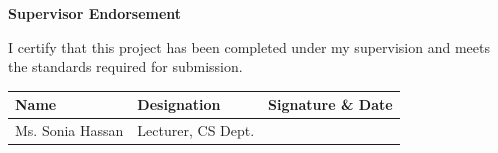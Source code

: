 \vspace{0.5cm}

\noindent\textbf{\textcolor{primaryblue}{Supervisor Endorsement}}

\vspace{0.3cm}

\noindent I certify that this project has been completed under my supervision and meets the standards required for submission.

\vspace{0.5cm}

\begin{table}[H]
\centering
\begin{tabular}{@{}p{5cm}p{4.5cm}p{4cm}@{}}
\textbf{Name} & \textbf{Designation} & \textbf{Signature \& Date} \\[0.2cm]
\midrule
Ms. Sonia Hassan & Lecturer, CS Dept. & \hrulefill \\
\end{tabular}
\end{table}

\newpage
